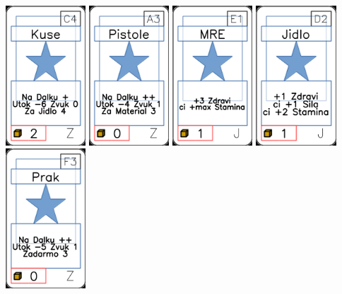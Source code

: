 \documentclass[a4paper]{article}
\begin{document}
	\includegraphics[width=3.0cm]{img-1_103}
	\includegraphics[width=3.0cm]{img-1_92}
	\includegraphics[width=3.0cm]{img-1_20}
	\includegraphics[width=3.0cm]{img-1_16}
	\includegraphics[width=3.0cm]{img-1_87}
\end{document}
